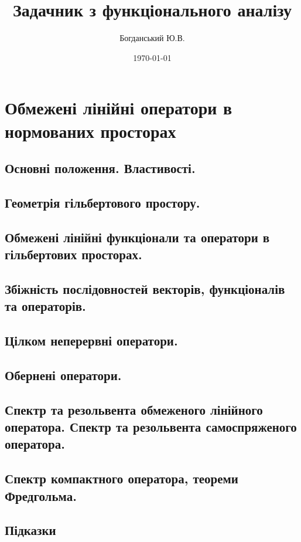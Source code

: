 \documentclass{extreport}
\author{Богданський Ю.В.}
\title{Задачник з функціонального аналізу}
\date{\today}
\begin{document}
    \maketitle
    \tableofcontents
    \chapter{Обмежені лінійні оператори в нормованих просторах}
        \section{Основні положення. Властивості.}
            
            
            
        \section{Геометрія гільбертового простору.}
            
            
            
            
        \section{Обмежені лінійні функціонали та оператори в гільбертових просторах.}
            
            
            
            
        \section{Збіжність послідовностей векторів, функціоналів та операторів.}
            
            
            
        \section{Цілком неперервні оператори.}
            
            
            
              
        \section{Обернені оператори.}
            
            
            
        \section{Спектр та резольвента обмеженого лінійного оператора. 
                 Спектр та резольвента самоспряженого оператора.}
            
            
            
        \section{Спектр компактного оператора, теореми Фредгольма.}
            
            
            
        \newpage
        \section*{Підказки}
            
\end{document}
